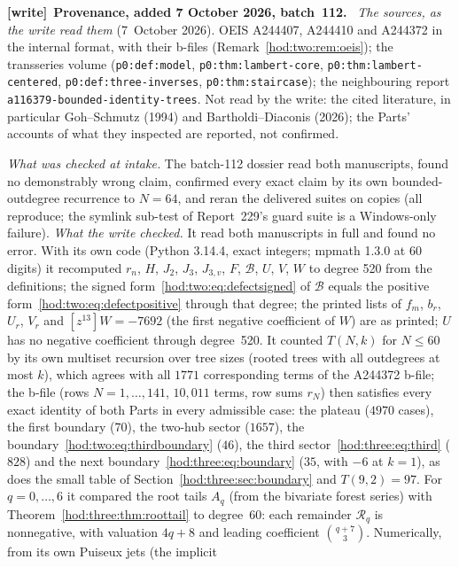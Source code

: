 \documentclass[11pt,letterpaper]{article}
\theoremstyle{definition}\newtheorem{definition}[theorem]{Definition}
\theoremstyle{remark}\newtheorem{remark}[theorem]{Remark}
\newcommand{\Bcal}{\mathcal B}
\newcommand{\Rcal}{\mathcal R}
\newcommand{\file}[1]{\nolinkurl{#1}}
\newenvironment{writenote}[1][]{\par\smallskip\begingroup\small
 \noindent\textbf{[write]}\if\relax\detokenize{#1}\relax\else~\textbf{#1.}\fi\ }%
 {\par\endgroup\smallskip}
\begin{document}
\begin{writenote}[Provenance, added 7 October 2026, batch~112]
\emph{The sources, as the write read them} (7~October 2026). OEIS A244407,
A244410 and A244372 in the internal format, with their b-files
(Remark~\ref{hod:two:rem:oeis}); the transseries volume
(\file{p0:def:model}, \file{p0:thm:lambert-core},
\file{p0:thm:lambert-centered}, \file{p0:def:three-inverses},
\file{p0:thm:staircase}); the neighbouring report
\file{a116379-bounded-identity-trees}. Not read by the write: the cited
literature, in particular Goh--Schmutz (1994) and Bartholdi--Diaconis (2026);
the Parts' accounts of what they inspected are reported, not confirmed.

\emph{What was checked at intake.} The batch-112 dossier read both
manuscripts, found no demonstrably wrong claim, confirmed every exact claim by
its own bounded-outdegree recurrence to $N=64$, and reran the delivered suites
on copies (all reproduce; the symlink sub-test of Report~229's guard suite is a
Windows-only failure). \emph{What the write checked.} It read both manuscripts
in full and found no error. With its own code (Python 3.14.4, exact integers;
mpmath 1.3.0 at 60 digits) it recomputed $r_n$, $H$, $J_2$, $J_3$, $J_{3,v}$,
$F$, $\Bcal$, $U$, $V$, $W$ to degree 520 from the definitions; the signed
form~\eqref{hod:two:eq:defectsigned} of $\Bcal$ equals the positive
form~\eqref{hod:two:eq:defectpositive} through that degree; the printed lists
of $f_m$, $b_r$, $U_r$, $V_r$ and $[z^{13}]W=-7692$ (the first negative
coefficient of $W$) are as printed; $U$ has no negative coefficient through
degree~520. It counted $T(N,k)$ for $N\le60$ by its own multiset recursion over
tree sizes (rooted trees with all outdegrees at most $k$), which agrees with
all $1771$ corresponding terms of the A244372 b-file; the b-file (rows
$N=1,\ldots,141$, $10{,}011$ terms, row sums $r_N$) then satisfies every
exact identity of both Parts in every admissible case: the plateau ($4970$
cases), the first boundary ($70$), the two-hub sector ($1657$), the
boundary~\eqref{hod:two:eq:thirdboundary} ($46$), the third
sector~\eqref{hod:three:eq:third} ($828$) and the next
boundary~\eqref{hod:three:eq:boundary} ($35$, with $-6$ at $k=1$), as does the
small table of Section~\ref{hod:three:sec:boundary} and $T(9,2)=97$. For
$q=0,\ldots,6$ it compared the root tails $A_q$ (from the bivariate forest
series) with Theorem~\ref{hod:three:thm:roottail} to degree~60: each remainder
$\Rcal_q$ is nonnegative, with valuation $4q+8$ and leading coefficient
$\binom{q+7}3$. Numerically, from its own Puiseux jets (the implicit

\end{writenote}
\end{document}
